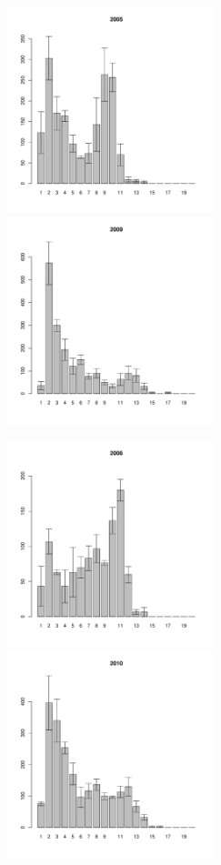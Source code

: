 \begin{figure}[h]
\begin{multicols}{3}
\hfill
\includegraphics[width=60mm]{../White_Sea/Estuatiy_Luvenga/sizestr_2005_.pdf}
\hfill
\includegraphics[width=60mm]{../White_Sea/Estuatiy_Luvenga/sizestr_2009_.pdf}
\end{multicols}


\begin{multicols}{3}
\hfill
\includegraphics[width=60mm]{../White_Sea/Estuatiy_Luvenga/sizestr_2006_.pdf}
\hfill
\includegraphics[width=60mm]{../White_Sea/Estuatiy_Luvenga/sizestr_2010_.pdf}
\end{multicols}


\end{figure}
